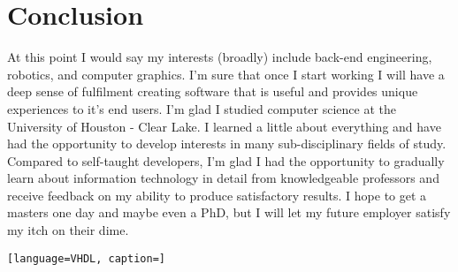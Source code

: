 \documentclass[notitlepage,a4paper,oneside,article,table]{article}
\begin{document}
\section{Conclusion} 
At this point I would say my interests (broadly) include back-end engineering, robotics, and computer graphics. I'm sure that once I start working I will have a deep sense of fulfilment creating software that is useful and provides unique experiences to it's end users. I'm glad I studied computer science at the University of Houston - Clear Lake. I learned a little about everything and have had the opportunity to develop interests in many sub-disciplinary fields of study. Compared to self-taught developers, I'm glad I had the opportunity to gradually learn about information technology in detail from knowledgeable professors and receive feedback on my ability to produce satisfactory results. I hope to get a masters one day and maybe even a PhD, but I will let my future employer satisfy my itch on their dime.

\iffalse
\section{References}
\begin{itemize}
  \item \textcolor{red}{}
\end{itemize}

\section{Appendices}
\begin{itemize}
  \item \textcolor{red}{N/A}
\end{itemize}
\fi



\lstset{style=mystyle}
\begin{lstlisting}[language=VHDL, caption=]

\end{lstlisting}
\end{document}
